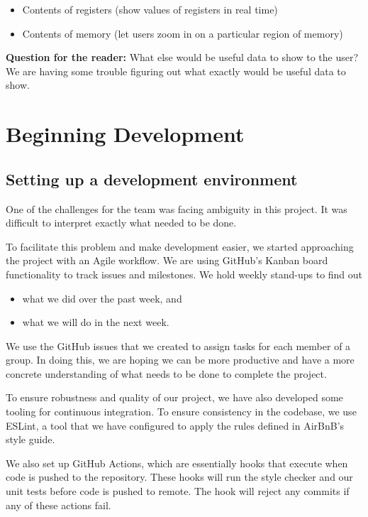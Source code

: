 \begin{itemize}
  \item Contents of registers (show values of registers in real time)
  \item Contents of memory (let users zoom in on a particular region of memory)
\end{itemize}

\textbf{Question for the reader:} What else would be useful data to show to the user?
We are having some trouble figuring out what exactly would be useful data to show.

\section{Beginning Development}

\subsection*{Setting up a development environment}

One of the challenges for the team was facing ambiguity in this project.
It was difficult to interpret exactly what needed to be done.

To facilitate this problem and make development easier, 
we started approaching the project with an Agile workflow.
We are using GitHub's Kanban board functionality to track issues and milestones.
We hold weekly stand-ups to find out

\begin{itemize}
  \item what we did over the past week, and
  \item what we will do in the next week.
\end{itemize}

\noindent
We use the GitHub issues that we created to assign tasks for each member of a group.
In doing this, we are hoping we can be more productive and have a more concrete
understanding of what needs to be done to complete the project.

To ensure robustness and quality of our project,
we have also developed some tooling for continuous integration.
To ensure consistency in the codebase, we use ESLint, a tool that we have configured
to apply the rules defined in AirBnB's style guide.

We also set up GitHub Actions, which are essentially hooks that execute when
code is pushed to the repository.
These hooks will run the style checker and our unit tests before code is pushed to remote.
The hook will reject any commits if any of these actions fail.

